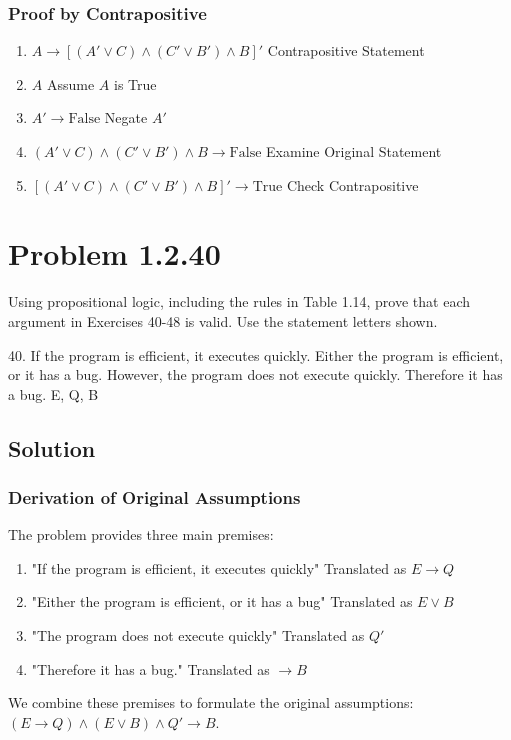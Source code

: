 \documentclass[12pt]{article}
\begin{document}
\subsubsection*{Proof by Contrapositive}

\begin{enumerate}
    \item \( A \to [(A' \lor C) \land (C' \lor B') \land B]' \) \hfill Contrapositive Statement
    \item \( A \) \hfill Assume \( A \) is True
    \item \( A' \to \text{False} \) \hfill Negate \( A' \)
    \item \( (A' \lor C) \land (C' \lor B') \land B \to \text{False} \) \hfill Examine Original Statement
    \item \( [(A' \lor C) \land (C' \lor B') \land B]' \to \text{True} \) \hfill Check Contrapositive
\end{enumerate}

\newpage
\section*{Problem 1.2.40}
Using propositional logic, including the rules in Table 1.14, prove that each argument in Exercises 40-48 is valid. Use the statement letters shown.
\newline

40. If the program is efficient, it executes quickly. Either the program is efficient, or it has a bug. However, the program does not execute quickly. Therefore it has a bug. E, Q, B

\newpage
\subsection*{Solution}
\subsubsection*{Derivation of Original Assumptions}
The problem provides three main premises:
\begin{enumerate}
    \item "If the program is efficient, it executes quickly" \hfill Translated as \( E \to Q \)
    \item "Either the program is efficient, or it has a bug" \hfill Translated as \( E \lor B \)
    \item "The program does not execute quickly" \hfill Translated as \( Q' \)
    \item "Therefore it has a bug." \hfill Translated as \( \to B \)
\end{enumerate}
We combine these premises to formulate the original assumptions: \( (E \to Q) \land (E \lor B) \land Q' \to B\).
\end{document}

